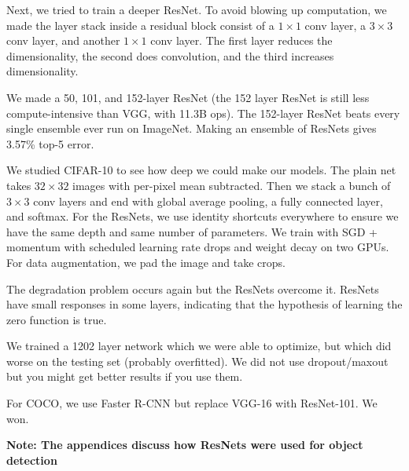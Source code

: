 \documentclass[a4paper]{article}
\begin{document}
Next, we tried to train a deeper ResNet. To avoid blowing up computation,
we made the layer stack inside a residual block consist of a $1 \times 1$
conv layer, a $3 \times 3$ conv layer, and another $1 \times 1$ conv layer.
The first layer reduces the dimensionality, the second does convolution, and
the third increases dimensionality.

We made a 50, 101, and 152-layer ResNet (the 152 layer ResNet is still less
compute-intensive than VGG, with 11.3B ops). The 152-layer ResNet beats 
every single ensemble ever run on ImageNet. Making an ensemble of ResNets
gives 3.57\% top-5 error.

We studied CIFAR-10 to see how deep we could make our models. The plain net
takes $32 \times 32$ images with per-pixel mean subtracted. Then we stack
a bunch of $3 \times 3$ conv layers and end with global average pooling, 
a fully connected layer, and softmax. For the ResNets, we use identity 
shortcuts everywhere to ensure we have the same depth and same number of
parameters. We train with SGD + momentum with scheduled learning rate drops
and weight decay on two GPUs. For data augmentation, we pad the image and
take crops.

The degradation problem occurs again but the ResNets overcome it. ResNets have
small responses in some layers, indicating that the hypothesis of learning
the zero function is true.

We trained a 1202 layer network which we were able to optimize, but which did
worse on the testing set (probably overfitted). We did not use dropout/maxout
but you might get better results if you use them.

For COCO, we use Faster R-CNN but replace VGG-16 with ResNet-101. We won.

\textbf{Note: The appendices discuss how ResNets were used for object detection}
\end{document}
